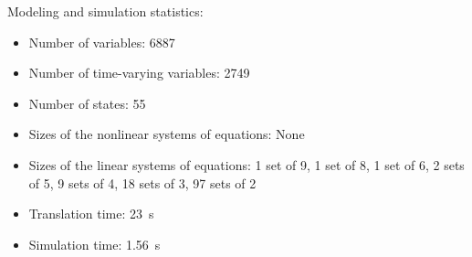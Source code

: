 \begin{contextbox}
  Modeling and simulation statistics:
  \begin{itemize}
    \item Number of variables: 6887
    \item Number of time-varying variables: 2749
    \item Number of states: 55
    \item Sizes of the nonlinear systems of equations: None
    \item Sizes of the linear systems of equations: 1 set of 9, 1 set of 8, 1 set of 6, 2 sets of 5, 9 sets of 4, 18 sets of 3, 97 sets of 2
    \item Translation time: \SI{23}{s}
    \item Simulation time: \SI{1.56}{s}
  \end{itemize}
\end{contextbox}